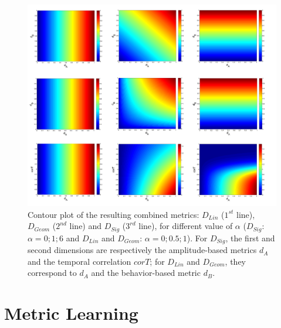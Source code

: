 \begin{figure}[h!]
	\centering
	\includegraphics[width=1\linewidth]{images/CombinedMetrics}
	\caption{Contour plot of the resulting combined metrics: $D_{Lin}$ ($1^{st}$ line), $D_{Geom}$ ($2^{nd}$ line) and $D_{Sig}$ ($3^{rd}$ line), for different value of $\alpha$ ($D_{Sig}$: $\alpha=0;1;6$ and $D_{Lin}$ and $D_{Geom}$: $\alpha=0;0.5;1$). For $D_{Sig}$, the first and second dimensions are respectively the amplitude-based metrics $d_A$ and the temporal correlation $corT$; for $D_{Lin}$ and $D_{Geom}$, they correspond to $d_A$ and the behavior-based metric $d_B$.}
	\label{fig:ContourLine}
\end{figure}

\section{Metric Learning}

